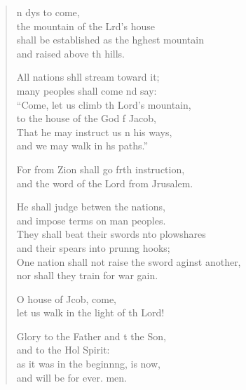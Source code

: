 \settowidth{\versewidth}{One nation shall not raise the sword against another, *}
\begin{verse}%
  \begin{patverse}
n dys to come,\Med\\
the mountain of the Lrd’s house\\
shall be established as the h\pointup{\i}ghest mountain\Med\\
and raised above th hills.

All nations shll stream toward it;\Med\\
many peoples shall come nd say:\\
“Come, let us climb th Lord’s mountain,\Med\\
to the house of the God f Jacob,\\
That he may instruct us \pointup{\i}n his ways, \Med\\
and we may walk in h\pointup{\i}s paths.”

For from Zion shall go frth instruction,\Med\\
and the word of the Lord from Jrusalem.

He shall judge betwen the nations,\Med\\
and impose terms on man peoples.\\
They shall beat their swords \pointup{\i}nto plowshares\Med\\
and their spears into prun\pointup{\i}ng hooks;\\
One nation shall not raise the sword aginst another,\Med\\
nor shall they train for war gain.

O house of Jcob, come,\Med\\
let us walk in the light of th Lord!

Glory to the Father and t the Son,\Med\\
    and to the Hol Spirit:\\
as it was in the beginn\pointup{\i}ng, is now,\Med\\
    and will be for ever. men.
  \end{patverse}
\end{verse}
